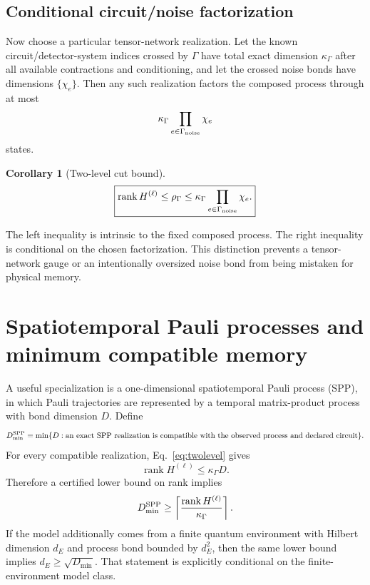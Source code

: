 \documentclass[11pt]{article}
\newtheorem{corollary}[theorem]{Corollary}
\newcommand{\rank}{\operatorname{rank}}
\begin{document}
\subsection{Conditional circuit/noise factorization}
Now choose a particular tensor-network realization. Let the known circuit/detector-system indices crossed by $\Gamma$ have total exact dimension $\kappa_\Gamma$ after all available contractions and conditioning, and let the crossed noise bonds have dimensions $\{\chi_e\}$. Then any such realization factors the composed process through at most
\[
\kappa_\Gamma\prod_{e\in\Gamma_{\rm noise}}\chi_e
\]
states.

\begin{corollary}[Two-level cut bound]
\begin{equation}
\boxed{\rank H^{(\ell)}\le\rho_\Gamma\le\kappa_\Gamma\prod_{e\in\Gamma_{\rm noise}}\chi_e.}
\label{eq:twolevel}
\end{equation}
\end{corollary}

The left inequality is intrinsic to the fixed composed process. The right inequality is conditional on the chosen factorization. This distinction prevents a tensor-network gauge or an intentionally oversized noise bond from being mistaken for physical memory.

\section{Spatiotemporal Pauli processes and minimum compatible memory}
A useful specialization is a one-dimensional spatiotemporal Pauli process (SPP), in which Pauli trajectories are represented by a temporal matrix-product process with bond dimension $D$. Define
\[
D_{\min}^{\rm SPP}=\min\{D:\text{an exact SPP realization is compatible with the observed process and declared circuit}\}.
\]
For every compatible realization, Eq.~\eqref{eq:twolevel} gives
\begin{equation}
\rank H^{(\ell)}\le\kappa_\Gamma D.
\label{eq:spp}
\end{equation}
Therefore a certified lower bound on rank implies
\begin{equation}
D_{\min}^{\rm SPP}\ge\left\lceil\frac{\rank H^{(\ell)}}{\kappa_\Gamma}\right\rceil.
\end{equation}
If the model additionally comes from a finite quantum environment with Hilbert dimension $d_E$ and process bond bounded by $d_E^2$, then the same lower bound implies $d_E\ge\sqrt{D_{\min}}$. That statement is explicitly conditional on the finite-environment model class.
\end{document}
